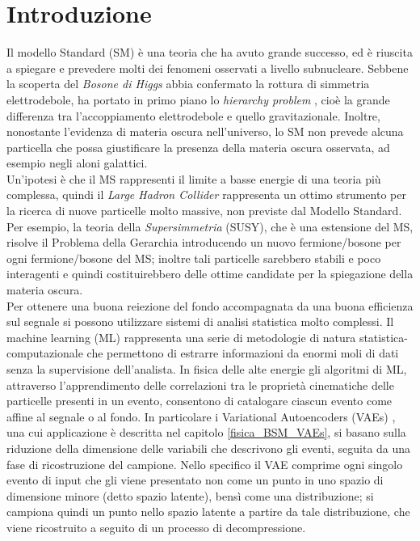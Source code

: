 %
\section{Introduzione}
\label{sec:introduzione}
%
Il modello Standard (SM) è una teoria che ha avuto grande successo, ed è riuscita a spiegare e prevedere molti dei fenomeni osservati a livello subnucleare. Sebbene la scoperta del \textit{Bosone di Higgs} \cite{Bosone_di_Higgs} abbia confermato la rottura di simmetria elettrodebole, ha portato in primo piano lo \textit{hierarchy problem} \cite{PG1,PG2,PG3,PG4}, cioè la grande differenza tra l'accoppiamento elettrodebole e quello gravitazionale. Inoltre, nonostante l'evidenza di materia oscura nell'universo, lo SM non prevede alcuna particella che possa giustificare la presenza della materia oscura osservata, ad esempio negli aloni galattici. \\
Un'ipotesi è che il MS rappresenti il limite a basse energie di una teoria più complessa, quindi il \textit{Large Hadron Collider} rappresenta un ottimo strumento per la ricerca di nuove particelle molto massive, non previste dal Modello Standard.\\
Per esempio, la teoria della \textit{Supersimmetria} (SUSY), che è una estensione del MS, risolve il Problema della Gerarchia introducendo un nuovo fermione/bosone per ogni fermione/bosone del MS; inoltre tali particelle sarebbero stabili e poco interagenti e quindi costituirebbero delle ottime candidate per la spiegazione della materia oscura. \\
Per ottenere una buona reiezione del fondo accompagnata da una buona efficienza sul segnale si possono utilizzare  sistemi di analisi statistica molto complessi. Il machine learning (ML) rappresenta una serie di metodologie di natura statistica-computazionale che permettono di estrarre informazioni da enormi moli di dati senza la supervisione dell'analista. In fisica delle alte energie gli algoritmi di ML, attraverso l'apprendimento delle correlazioni tra le proprietà cinematiche delle particelle presenti in un evento, consentono di catalogare ciascun evento come affine al segnale o al fondo. In particolare i Variational Autoencoders (VAEs) \cite{Understanding_VAEs}, una cui applicazione è descritta nel capitolo \ref{fisica_BSM_VAEs}, si basano sulla riduzione della dimensione delle variabili che descrivono gli eventi, seguita da una fase di ricostruzione del campione. Nello specifico il VAE comprime ogni singolo evento di input che gli viene presentato non come un punto in uno spazio di dimensione minore (detto spazio latente), bensì come una distribuzione; si campiona quindi un punto nello spazio latente a partire da tale distribuzione, che viene ricostruito a seguito di un processo di decompressione. \\
